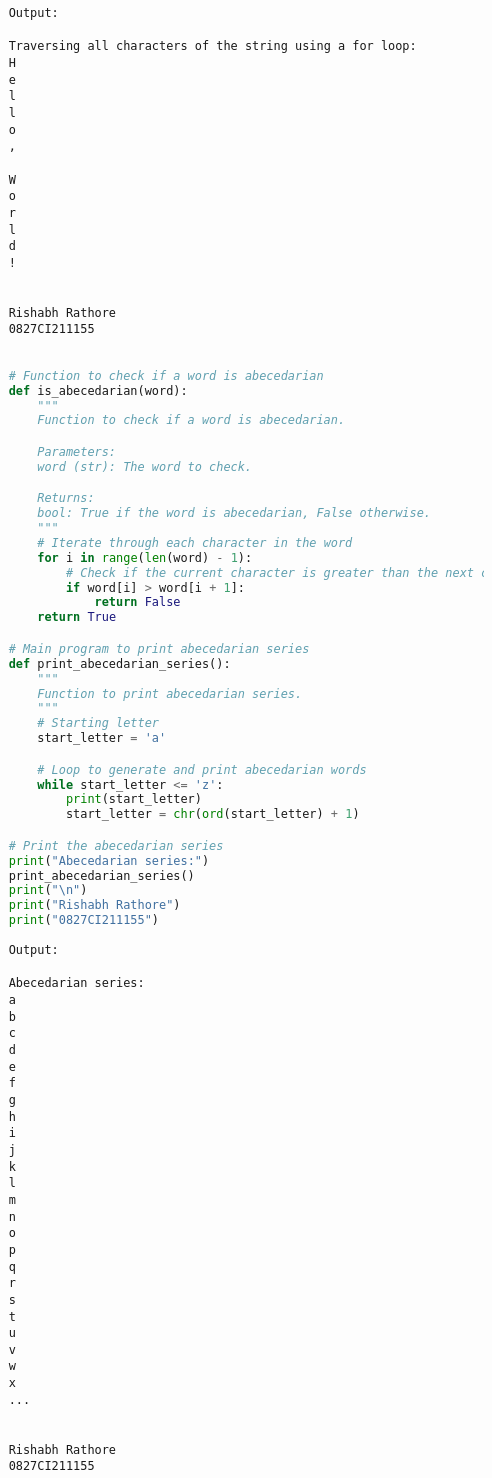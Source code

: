 \documentclass{report}
\begin{document}
\begin{verbatim}
	Output:

	Traversing all characters of the string using a for loop:
	H
	e
	l
	l
	o
	,
	 
	W
	o
	r
	l
	d
	!
	
	
	Rishabh Rathore
	0827CI211155
\end{verbatim}
\bigskip


\sol{}
\begin{lstlisting}[language=Python]

	# Function to check if a word is abecedarian
	def is_abecedarian(word):
		"""
		Function to check if a word is abecedarian.

		Parameters:
		word (str): The word to check.

		Returns:
		bool: True if the word is abecedarian, False otherwise.
		"""
		# Iterate through each character in the word
		for i in range(len(word) - 1):
			# Check if the current character is greater than the next character
			if word[i] > word[i + 1]:
				return False
		return True

	# Main program to print abecedarian series
	def print_abecedarian_series():
		"""
		Function to print abecedarian series.
		"""
		# Starting letter
		start_letter = 'a'

		# Loop to generate and print abecedarian words
		while start_letter <= 'z':
			print(start_letter)
			start_letter = chr(ord(start_letter) + 1)

	# Print the abecedarian series
	print("Abecedarian series:")
	print_abecedarian_series()
	print("\n")
	print("Rishabh Rathore")
	print("0827CI211155")
\end{lstlisting}

\begin{verbatim}
	Output:

	Abecedarian series:
	a
	b
	c
	d
	e
	f
	g
	h
	i
	j
	k
	l
	m
	n
	o
	p
	q
	r
	s
	t
	u
	v
	w
	x
	...
	
	
	Rishabh Rathore
	0827CI211155
\end{verbatim}
\bigskip
\end{document}
